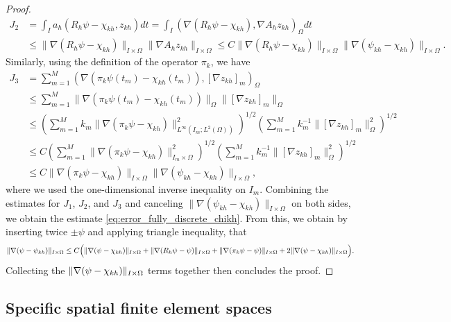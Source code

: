 \documentclass{m2an}
\newcommand{\1}{\mathds{1}}
\newcommand{\Om}{\Omega}
\DeclarePairedDelimiter{\norm}{\lVert}{\rVert}
\newcommand{\na}{\nabla}
\theoremstyle{definition}
\begin{document}
\begin{proof}
$$\begin{aligned}
  J_2 &= \int_I a_h(R_h \psi -\chi_{kh},z_{kh})dt
  =\int_I (\na (R_h \psi - \chi_{kh}),\na A_hz_{kh})_\Om dt\\
      &\le \|\na (R_h \psi - \chi_{kh})\|_{I\times \Om}\|\na A_hz_{kh}\|_{I\times \Om} 
      \le C\|\na (R_h \psi - \chi_{kh})\|_{I\times \Om}\|\na (\psi_{kh}-\chi_{kh})\|_{I\times \Om}.
\end{aligned}
$$
Similarly, using the definition of the operator $\pi_k$, we have 
$$
\begin{aligned}
  J_3 &= \sum_{m=1}^M(\na(\pi_k \psi(t_m)-\chi_{kh}(t_m)),[\na z_{kh}]_m)_\Omega\\
      &\le  \sum_{m=1}^M\|\na (\pi_k  \psi(t_m) - \chi_{kh}(t_m))\|_\Omega\|[\na z_{kh}]_m\|_\Omega\\
      &\le  \left(\sum_{m=1}^M k_m\|\na(\pi_k \psi - \chi_{kh})\|^2_{L^\infty(I_m; L^2(\Om))}\right)^{1/2}\left(\sum_{m=1}^M k^{-1}_m\|[\na z_{kh}]_m\|^2_\Omega\right)^{1/2}\\
      &\le  C\left(\sum_{m=1}^M \|\na(\pi_k \psi -\chi_{kh})\|^2_{I_m\times\Omega}\right)^{1/2}\left(\sum_{m=1}^M k^{-1}_m\|[\na z_{kh}]_m\|^2_\Omega\right)^{1/2}\\
      &\le C\|\na (\pi_k \psi -\chi_{kh})\|_{I\times \Om}\|\na (\psi_{kh} - \chi_{kh})\|_{I\times \Om},
\end{aligned}
$$
where we used the one-dimensional inverse inequality on $I_m$.
Combining the estimates for $J_1$, $J_2$, and $J_3$ and canceling $\|\na( \psi_{kh} - \chi_{kh})\|_{I\times \Om}$ on both sides, we obtain the estimate \eqref{eq:error_fully_discrete_chikh}.  
From this, we obtain by inserting twice $\pm \psi$ and applying triangle inequality, that
\begin{equation*}
    \norm{\na(\psi-\psi_{{kh}})}_{I\times\Omega} 
    \leq C  \Big(\norm{\na(\psi-\chi_{kh})}_{I\times\Omega}
    +\norm{\na (R_h \psi - \psi)}_{I\times\Omega} 
    +\norm{\na (\pi_k\psi - \psi)}_{I\times\Omega}
    +2\norm{\na (\psi - \chi_{kh})}_{I\times\Omega}
    \Big).
\end{equation*}
Collecting the $\norm{\na (\psi - \chi_{kh})}_{I\times\Omega}$ terms together then concludes the proof.
\end{proof}





\subsection{Specific spatial finite element spaces}
\end{document}
